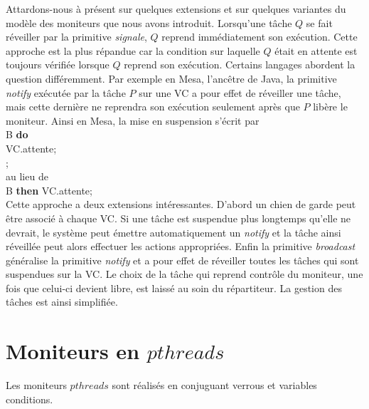 \par
Attardons-nous à présent sur quelques extensions et sur quelques variantes du modèle des moniteurs que nous avons introduit. Lorsqu'une tâche $Q$ se fait réveiller par la primitive {\em signale}, $Q$ reprend immédiatement son exécution. Cette approche est la plus répandue car la condition sur laquelle $Q$ était en attente est toujours vérifiée lorsque $Q$ reprend son exécution. Certains langages abordent la question différemment.  Par exemple en Mesa, l'ancêtre de Java, la primitive {\em notify} exécutée par la tâche $P$ sur une VC a pour effet de réveiller une tâche, mais cette dernière ne reprendra son exécution seulement après que $P$ libère le moniteur. Ainsi en Mesa, la mise en suspension s'écrit par  \\
\hspace*{1cm}{\bf while} B {\bf do}  \\
\hspace*{1.3cm}VC.attente;  \\
\hspace*{1cm}{\bf end};  \\
au lieu de  \\
\hspace*{1cm}{\bf if} B {\bf then}  VC.attente; \\
Cette approche a deux extensions intéressantes. D'abord un chien de garde peut être associé à chaque VC. Si une tâche est suspendue plus longtemps qu'elle ne devrait, le système peut émettre automatiquement un {\em notify} et la tâche ainsi réveillée peut alors effectuer les actions appropriées. Enfin la primitive {\em broadcast} généralise la primitive {\em notify} et a pour effet de réveiller toutes les tâches qui sont suspendues sur la VC. Le choix de la tâche qui reprend contrôle du moniteur, une fois que celui-ci devient libre, est laissé au soin du répartiteur. La gestion des tâches est ainsi simplifiée.

\section{Moniteurs en $pthreads$}
Les moniteurs $pthreads$ sont réalisés en conjuguant verrous et variables conditions.
